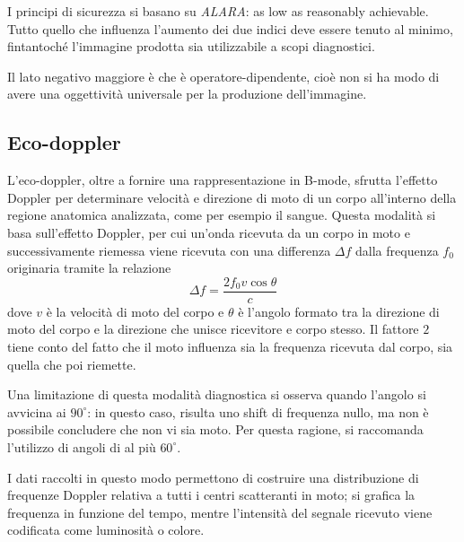 \documentclass[11pt, a4paper]{scrartcl}
\theoremstyle{style}
\theoremstyle{style1}
\numberwithin{equation}{subsection}
\begin{document}
I principi di sicurezza si basano su \textit{ALARA}: as low as reasonably achievable. 
Tutto quello che influenza l'aumento dei due indici deve essere tenuto al minimo, fintantoch\'e l'immagine prodotta sia utilizzabile a scopi diagnostici.

Il lato negativo maggiore \`e che \`e operatore-dipendente, cio\`e non si ha modo di avere una oggettivit\`a universale per la produzione dell'immagine.

\subsection{Eco-doppler}

L'eco-doppler, oltre a fornire una rappresentazione in B-mode, sfrutta l'effetto Doppler per determinare velocit\`a e direzione di moto di un corpo all'interno della regione anatomica analizzata, come per esempio il sangue.
Questa modalit\`a si basa sull'effetto Doppler, per cui un'onda ricevuta da un corpo in moto e successivamente riemessa viene ricevuta con una differenza $\Delta f$ dalla frequenza $f_0$ originaria tramite la relazione
\begin{equation}
	\Delta f = \frac{2f_0 v \cos \theta }{c}
\end{equation}
dove $v$ \`e la velocit\`a di moto del corpo e $\theta $ \`e l'angolo formato tra la direzione di moto del corpo e la direzione che unisce ricevitore e corpo stesso.
Il fattore $2$ tiene conto del fatto che il moto influenza sia la frequenza ricevuta dal corpo, sia quella che poi riemette.

Una limitazione di questa modalit\`a diagnostica si osserva quando l'angolo si avvicina ai $90^\circ$: in questo caso, risulta uno shift di frequenza nullo, ma non \`e possibile concludere che non vi sia moto.
Per questa ragione, si raccomanda l'utilizzo di angoli di al pi\`u $60^\circ$.

I dati raccolti in questo modo permettono di costruire una distribuzione di frequenze Doppler relativa a tutti i centri scatteranti in moto; si grafica la frequenza in funzione del tempo, mentre l'intensit\`a del segnale ricevuto viene codificata come luminosit\`a o colore.
\end{document}
